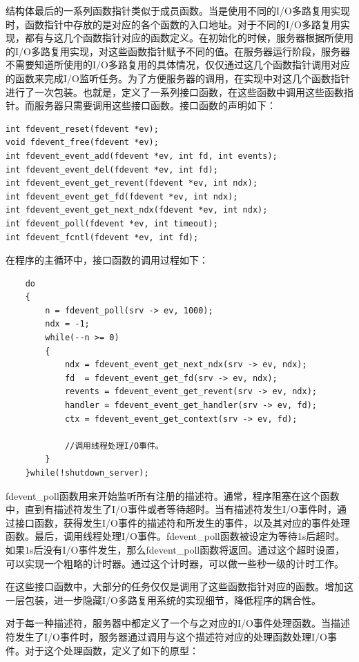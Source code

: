\documentclass[12pt, twoside, a4paper, xetex]{report}
\begin{document}
	结构体最后的一系列函数指针类似于成员函数。当是使用不同的I/O多路复用实现时，函数指针中存放的是对应的各个函数的入口地址。对于不同的I/O多路复用实现，都有与这几个函数指针对应的函数定义。在初始化的时候，服务器根据所使用的I/O多路复用实现，对这些函数指针赋予不同的值。在服务器运行阶段，服务器不需要知道所使用的I/O多路复用的具体情况，仅仅通过这几个函数指针调用对应的函数来完成I/O监听任务。为了方便服务器的调用，在实现中对这几个函数指针进行了一次包装。也就是，定义了一系列接口函数，在这些函数中调用这些函数指针。而服务器只需要调用这些接口函数。接口函数的声明如下：
	
\begin{verbatim}
int fdevent_reset(fdevent *ev);
void fdevent_free(fdevent *ev);
int fdevent_event_add(fdevent *ev, int fd, int events);
int fdevent_event_del(fdevent *ev, int fd);
int fdevent_event_get_revent(fdevent *ev, int ndx);
int fdevent_event_get_fd(fdevent *ev, int ndx);
int fdevent_event_get_next_ndx(fdevent *ev, int ndx);
int fdevent_poll(fdevent *ev, int timeout);
int fdevent_fcntl(fdevent *ev, int fd);
\end{verbatim}

	在程序的主循环中，接口函数的调用过程如下：

\begin{verbatim}
	do
	{
		n = fdevent_poll(srv -> ev, 1000);
		ndx = -1;
		while(--n >= 0)
		{
			ndx = fdevent_event_get_next_ndx(srv -> ev, ndx);
			fd  = fdevent_event_get_fd(srv -> ev, ndx);
			revents = fdevent_event_get_revent(srv -> ev, ndx);
			handler = fdevent_event_get_handler(srv -> ev, fd);
			ctx = fdevent_event_get_context(srv -> ev, fd);			
			
			//调用线程处理I/O事件。
		}
	}while(!shutdown_server);
\end{verbatim}	
	
	fdevent\_poll函数用来开始监听所有注册的描述符。通常，程序阻塞在这个函数中，直到有描述符发生了I/O事件或者等待超时。当有描述符发生I/O事件时，通过接口函数，获得发生I/O事件的描述符和所发生的事件，以及其对应的事件处理函数。最后，调用线程处理I/O事件。fdevent\_poll函数被设定为等待1s后超时。如果1s后没有I/O事件发生，那么fdevent\_poll函数将返回。通过这个超时设置，可以实现一个粗略的计时器。通过这个计时器，可以做一些秒一级的计时工作。
	
	在这些接口函数中，大部分的任务仅仅是调用了这些函数指针对应的函数。增加这一层包装，进一步隐藏I/O多路复用系统的实现细节，降低程序的耦合性。

	对于每一种描述符，服务器中都定义了一个与之对应的I/O事件处理函数。当描述符发生了I/O事件时，服务器通过调用与这个描述符对应的处理函数处理I/O事件。对于这个处理函数，定义了如下的原型：
	
\end{document}
